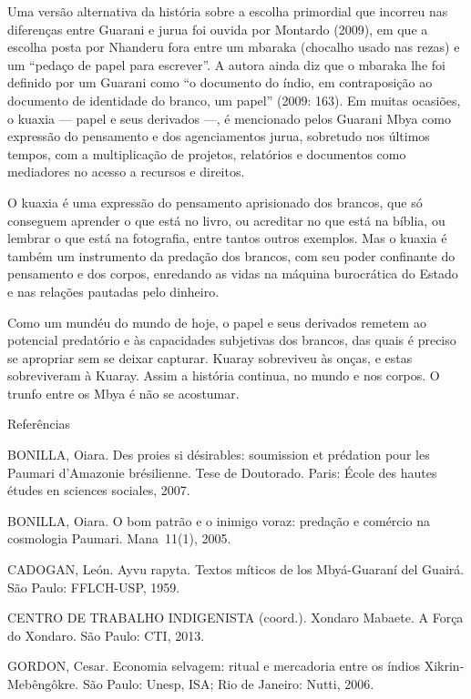 \documentclass{article}
\begin{document}
Uma vers\~ao alternativa da hist\'oria sobre a escolha primordial que
incorreu nas diferen\c{c}as entre Guarani e jurua foi ouvida por
Montardo (2009), em que a escolha posta por Nhanderu fora entre um
mbaraka (chocalho usado nas rezas) e um {\textquotedblleft}peda\c{c}o
de papel para escrever{\textquotedblright}. A autora ainda diz que o
mbaraka lhe foi definido por um Guarani como {\textquotedblleft}o
documento do \'indio, em contraposi\c{c}\~ao ao documento de identidade
do branco, um papel{\textquotedblright} (2009: 163). Em muitas
ocasi\~oes, o kuaxia --- papel e seus derivados ---, \'e mencionado
pelos Guarani Mbya como express\~ao do pensamento e dos agenciamentos
jurua, sobretudo nos \'ultimos tempos, com a multiplica\c{c}\~ao de
projetos, relat\'orios e documentos como mediadores no acesso a
recursos e direitos.

O kuaxia \'e uma express\~ao do pensamento aprisionado dos brancos, que
s\'o conseguem aprender o que est\'a no livro, ou acreditar no que
est\'a na b\'iblia, ou lembrar o que est\'a na fotografia, entre tantos
outros exemplos. Mas o kuaxia \'e tamb\'em um instrumento da
preda\c{c}\~ao dos brancos, com seu poder confinante do pensamento e
dos corpos, enredando as vidas na m\'aquina burocr\'atica do Estado e
nas rela\c{c}\~oes pautadas pelo dinheiro. 

Como um mund\'eu do mundo de hoje, o papel e seus derivados remetem ao
potencial predat\'orio e \`as capacidades subjetivas dos brancos, das
quais \'e preciso se apropriar sem se deixar capturar. Kuaray
sobreviveu \`as on\c{c}as, e estas sobreviveram \`a Kuaray. Assim a
hist\'oria continua, no mundo e nos corpos. O trunfo entre os Mbya \'e
n\~ao se acostumar.

Refer\^encias  

BONILLA, Oiara. Des proies si d\'esirables: soumission et pr\'edation
pour les Paumari d{\textquoteright}Amazonie br\'{e}silienne. Tese de
Doutorado.  Paris: \'Ecole des hautes \'etudes en sciences sociales,
2007.

BONILLA, Oiara. O bom patr\~ao e o inimigo voraz: preda\c{c}\~ao e
com\'ercio na cosmologia Paumari. Mana~11(1), 2005.

CADOGAN, Le\'on. Ayvu rapyta. Textos m\'iticos de los Mby\'a-Guaran\'i
del Guair\'a. S\~ao Paulo: FFLCH-USP, 1959.

CENTRO DE TRABALHO INDIGENISTA (coord.). Xondaro Mabaete. A For\c{c}a do
Xondaro. S\~ao Paulo: CTI, 2013.

GORDON, Cesar. Economia selvagem: ritual e mercadoria entre os \'indios
Xikrin-Meb\^eng\^okre. S\~ao Paulo: Unesp, ISA; Rio de Janeiro: Nutti,
2006.
\end{document}

